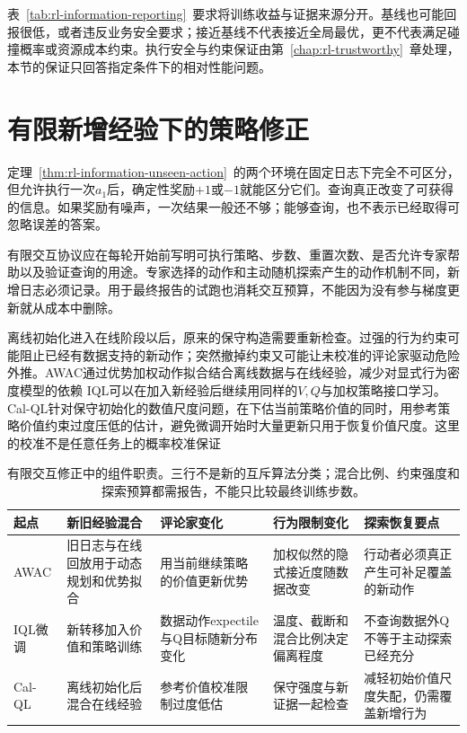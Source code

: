 表~\ref{tab:rl-information-reporting}~要求将训练收益与证据来源分开。基线也可能回报很低，或者违反业务安全要求；接近基线不代表接近全局最优，更不代表满足碰撞概率或资源成本约束。执行安全与约束保证由第~\ref{chap:rl-trustworthy}~章处理，本节的保证只回答指定条件下的相对性能问题。

\section{有限新增经验下的策略修正}
\label{sec:rl-information-limited-interaction}

定理~\ref{thm:rl-information-unseen-action}~的两个环境在固定日志下完全不可区分，但允许执行一次$a_1$后，确定性奖励$+1$或$-1$就能区分它们。查询真正改变了可获得的信息。如果奖励有噪声，一次结果一般还不够；能够查询，也不表示已经取得可忽略误差的答案。

有限交互协议应在每轮开始前写明可执行策略、步数、重置次数、是否允许专家帮助以及验证查询的用途。专家选择的动作和主动随机探索产生的动作机制不同，新增日志必须记录。用于最终报告的试跑也消耗交互预算，不能因为没有参与梯度更新就从成本中删除。

离线初始化进入在线阶段以后，原来的保守构造需要重新检查。过强的行为约束可能阻止已经有数据支持的新动作；突然撤掉约束又可能让未校准的评论家驱动危险外推。AWAC通过优势加权动作拟合结合离线数据与在线经验，减少对显式行为密度模型的依赖
IQL可以在加入新经验后继续用同样的$V,Q$与加权策略接口学习。Cal-QL针对保守初始化的数值尺度问题，在下估当前策略价值的同时，用参考策略价值约束过度压低的估计，避免微调开始时大量更新只用于恢复价值尺度。这里的校准不是任意任务上的概率校准保证

\begin{table}[t]
  \centering
  \small
  \begin{tabularx}{\linewidth}{p{18mm}XXXX}
    \toprule
    起点 & 新旧经验混合 & 评论家变化 & 行为限制变化 & 探索恢复要点 \\
    \midrule
    AWAC & 旧日志与在线回放用于动态规划和优势拟合 & 用当前继续策略的价值更新优势 & 加权似然的隐式接近度随数据改变 & 行动者必须真正产生可补足覆盖的新动作 \\
    IQL微调 & 新转移加入价值和策略训练 & 数据动作expectile与Q目标随新分布变化 & 温度、截断和混合比例决定偏离程度 & 不查询数据外Q不等于主动探索已经充分 \\
    Cal-QL & 离线初始化后混合在线经验 & 参考价值校准限制过度低估 & 保守强度与新证据一起检查 & 减轻初始价值尺度失配，仍需覆盖新增行为 \\
    \bottomrule
  \end{tabularx}
  \caption{有限交互修正中的组件职责。三行不是新的互斥算法分类；混合比例、约束强度和探索预算都需报告，不能只比较最终训练步数。}
  \label{tab:rl-information-finetuning}
\end{table}

